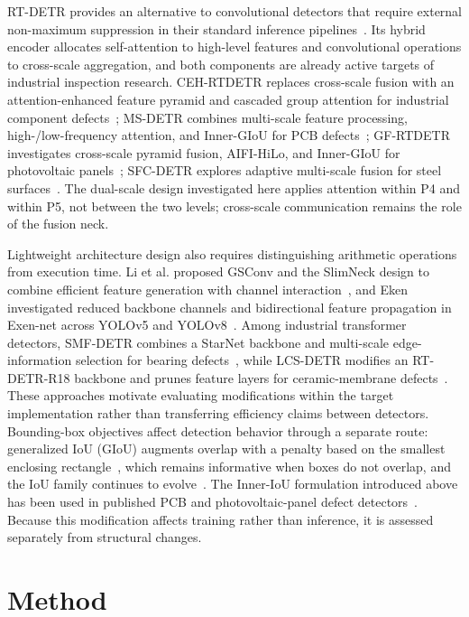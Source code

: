 \documentclass[pdflatex,sn-mathphys-num,iicol]{sn-jnl}
\begin{document}
RT-DETR provides an alternative to convolutional detectors that require external non-maximum suppression in their standard inference pipelines~\cite{zhao2024rtdetr}. Its hybrid encoder allocates self-attention to high-level features and convolutional operations to cross-scale aggregation, and both components are already active targets of industrial inspection research. CEH-RTDETR replaces cross-scale fusion with an attention-enhanced feature pyramid and cascaded group attention for industrial component defects~\cite{qu2025cehrtdetr}; MS-DETR combines multi-scale feature processing, high-/low-frequency attention, and Inner-GIoU for PCB defects~\cite{ji2025msdetr}; GF-RTDETR investigates cross-scale pyramid fusion, AIFI-HiLo, and Inner-GIoU for photovoltaic panels~\cite{chen2025gfrtdetr}; SFC-DETR explores adaptive multi-scale fusion for steel surfaces~\cite{ruan2026sfcdetr}. The dual-scale design investigated here applies attention within P4 and within P5, not between the two levels; cross-scale communication remains the role of the fusion neck.

Lightweight architecture design also requires distinguishing arithmetic operations from execution time. Li et al. proposed GSConv and the SlimNeck design to combine efficient feature generation with channel interaction~\cite{li2024slimneck}, and Eken investigated reduced backbone channels and bidirectional feature propagation in Exen-net across YOLOv5 and YOLOv8~\cite{eken2026exennet}. Among industrial transformer detectors, SMF-DETR combines a StarNet backbone and multi-scale edge-information selection for bearing defects~\cite{gao2026smfdetr}, while LCS-DETR modifies an RT-DETR-R18 backbone and prunes feature layers for ceramic-membrane defects~\cite{ma2026lcsdetr}. These approaches motivate evaluating modifications within the target implementation rather than transferring efficiency claims between detectors. Bounding-box objectives affect detection behavior through a separate route: generalized IoU (GIoU) augments overlap with a penalty based on the smallest enclosing rectangle~\cite{rezatofighi2019giou}, which remains informative when boxes do not overlap, and the IoU family continues to evolve~\cite{liu2024powerfuliou,sun2024fusediou}. The Inner-IoU formulation introduced above has been used in published PCB and photovoltaic-panel defect detectors~\cite{ji2025msdetr,chen2025gfrtdetr}. Because this modification affects training rather than inference, it is assessed separately from structural changes.

\section{Method}\label{sec:method}
\end{document}

